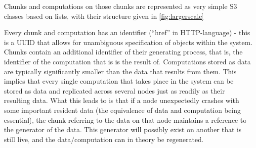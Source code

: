 Chunks and computations on those chunks are represented as very simple S3 classes based on lists, with their structure given in \cref{fig:largerscale}


Every chunk and computation has an identifier (``href'' in HTTP-language) - this is a UUID that allows for unambiguous specification of objects within the system.
Chunks contain an additional identifier of their generating process, that is, the identifier of the computation that is is the result of.
Computations stored as data are typically significantly smaller than the data that results from them.
This implies that every single computation that takes place in the system can be stored as data and replicated across several nodes just as readily as their resulting data.
What this leads to is that if a node unexpectedly crashes with some important resident data (the equivalence of data and computation being essential), the chunk referring to the data on that node maintains a reference to the generator of the data.
This generator will possibly exist on another that is still live, and the data/computation can in theory be regenerated.

